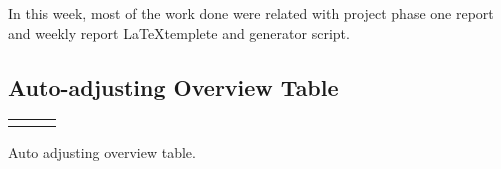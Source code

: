 \documentclass[../weekly]{subfiles}
\begin{document}

In this week, most of the work done were related with project phase one report and weekly
report \LaTeX templete and generator script.

\subsection{Auto-adjusting Overview Table}

\begin{center}
    \begin{tabular} {
            ccc
        }

        \includegraphics [
            width = 0.30\textwidth,
        ] {wr1.pdf}


        &
        \includegraphics [
            width = 0.30\textwidth,
        ] {wr3.pdf}

        &
        \includegraphics [
            width = 0.30\textwidth,
        ] {wr4.pdf}

        \\

    \end{tabular}
     {Auto adjusting overview table.}
\end{center}
\end{document}

